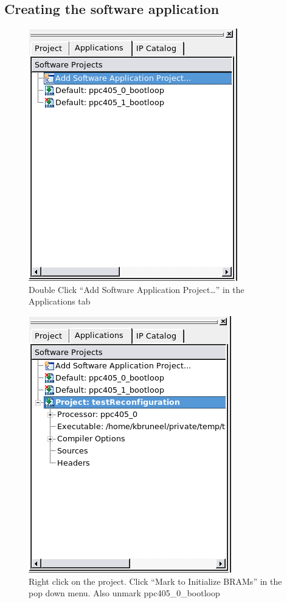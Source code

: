\documentclass[a4paper,oneside]{memoir}
\begin{document}
\subsection{Creating the software application}\label{sec:creating_software}
\begin{figure}[H]
\centering
\includegraphics[scale=0.5]{soft1}
\caption{Double Click ``Add Software Application Project\dots'' in the Applications tab\label{fig:soft1}}
\end{figure}
\begin{figure}[H]
\centering
\includegraphics[scale=0.5]{soft2}
\caption{Right click  on the project. Click ``Mark to Initialize BRAMs'' in the pop down menu. Also unmark ppc405\_0\_bootloop\label{fig:soft2}}
\end{figure}
\end{document}
